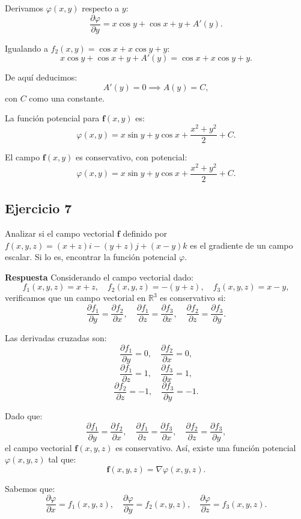 \documentclass{report}
\begin{document}
Derivamos \( \varphi(x, y) \) respecto a \( y \):
\[
\frac{\partial \varphi}{\partial y} = x \cos y + \cos x + y + A'(y).
\]

Igualando a \( f_2(x, y) = \cos x + x \cos y + y \):
\[
x \cos y + \cos x + y + A'(y) = \cos x + x \cos y + y.
\]

De aquí deducimos:
\[
A'(y) = 0 \implies A(y) = C,
\]
con \( C \) como una constante.



La función potencial para $\mathbf{f}(x, y)$ es:
\[
\varphi(x, y) = x \sin y + y \cos x + \frac{x^2 + y^2}{2} + C.
\]



El campo $\boldsymbol{f}(x, y)$ es conservativo, con potencial:
\[
{\varphi(x, y) = x \sin y + y \cos x + \frac{x^2 + y^2}{2} + C}.
\]

\subsection*{Ejercicio 7}
Analizar si el campo vectorial $\boldsymbol{f}$ definido por $f(x, y, z)=(x+z) i-(y+z) j+(x-y) k$ es el gradiente de un campo escalar. Si lo es, encontrar la función potencial $\varphi$.

\textbf{Respuesta}
Considerando el campo vectorial dado:
\[
f_1(x, y, z) = x + z, \quad f_2(x, y, z) = -(y + z), \quad f_3(x, y, z) = x - y,
\]
verificamos que un campo vectorial en \(\mathbb{R}^3\) es conservativo si:
\[
\frac{\partial f_1}{\partial y} = \frac{\partial f_2}{\partial x}, \quad
\frac{\partial f_1}{\partial z} = \frac{\partial f_3}{\partial x}, \quad
\frac{\partial f_2}{\partial z} = \frac{\partial f_3}{\partial y}.
\]

Las derivadas cruzadas son:
\[
\frac{\partial f_1}{\partial y} = 0, \quad \frac{\partial f_2}{\partial x} = 0,
\]
\[
\frac{\partial f_1}{\partial z} = 1, \quad \frac{\partial f_3}{\partial x} = 1,
\]
\[
\frac{\partial f_2}{\partial z} = -1, \quad \frac{\partial f_3}{\partial y} = -1.
\]

Dado que:
\[
\frac{\partial f_1}{\partial y} = \frac{\partial f_2}{\partial x}, \quad
\frac{\partial f_1}{\partial z} = \frac{\partial f_3}{\partial x}, \quad
\frac{\partial f_2}{\partial z} = \frac{\partial f_3}{\partial y},
\]
el campo vectorial \( \mathbf{f}(x, y, z) \) es conservativo. Así, existe una función potencial \( \varphi(x, y, z) \) tal que:
\[
\mathbf{f}(x, y, z) = \nabla \varphi(x, y, z).
\]



Sabemos que:
\[
\frac{\partial \varphi}{\partial x} = f_1(x, y, z), \quad
\frac{\partial \varphi}{\partial y} = f_2(x, y, z), \quad
\frac{\partial \varphi}{\partial z} = f_3(x, y, z).
\]
\end{document}
